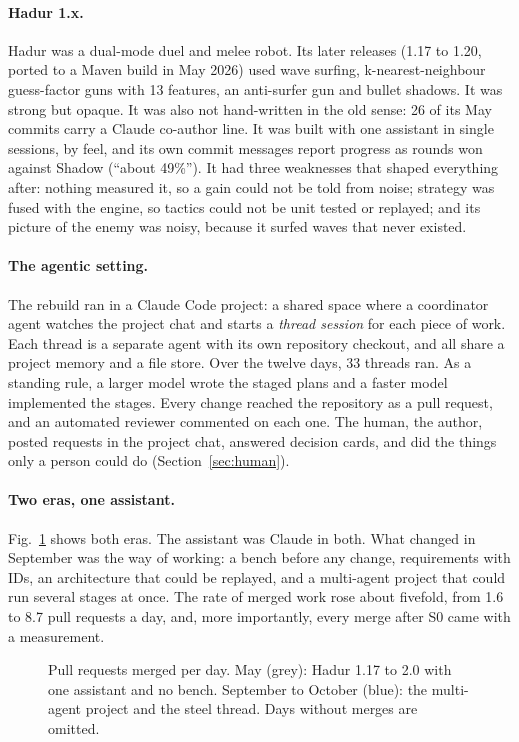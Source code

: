\documentclass[10pt,twocolumn]{article}
\begin{document}
\paragraph{Hadur 1.x.} Hadur was a dual-mode duel and melee robot. Its later releases (1.17 to
1.20, ported to a Maven build in May 2026) used wave surfing, k-nearest-neighbour guess-factor
guns with 13 features, an anti-surfer gun and bullet shadows. It was strong but opaque. It was also
not hand-written in the old sense: 26 of its May commits carry a Claude co-author line. It was built
with one assistant in single sessions, by feel, and its own commit messages report progress as
rounds won against Shadow (``about 49\%''). It had
three weaknesses that shaped everything after: nothing measured it, so a gain could not be told
from noise; strategy was fused with the engine, so tactics could not be unit tested or replayed;
and its picture of the enemy was noisy, because it surfed waves that never existed.

\paragraph{The agentic setting.} The rebuild ran in a Claude Code project: a shared space where a
coordinator agent watches the project chat and starts a \emph{thread session} for each piece of
work. Each thread is a separate agent with its own repository checkout, and all share a project
memory and a file store. Over the twelve days, 33 threads ran. As a standing rule, a larger model
wrote the staged plans and a faster model implemented the stages. Every change reached the
repository as a pull request, and an automated reviewer commented on each one. The human, the
author, posted requests in the project chat, answered decision cards, and did the things only
a person could do (Section~\ref{sec:human}).

\paragraph{Two eras, one assistant.} Fig.~\ref{fig:activity} shows both eras. The assistant was Claude in
both. What changed in September was the way of working: a bench before any
change, requirements with IDs, an architecture that could be replayed, and a multi-agent project
that could run several stages at once. The rate of merged work rose about fivefold, from 1.6 to 8.7 pull requests a day, and, more
importantly, every merge after S0 came with a measurement.

\begin{figure}[t]
\centering

\caption{Pull requests merged per day. May (grey): Hadur 1.17 to 2.0 with one assistant and no
bench. September to October (blue): the multi-agent project and the steel thread. Days without
merges are omitted.}
\label{fig:activity}
\end{figure}
\end{document}
